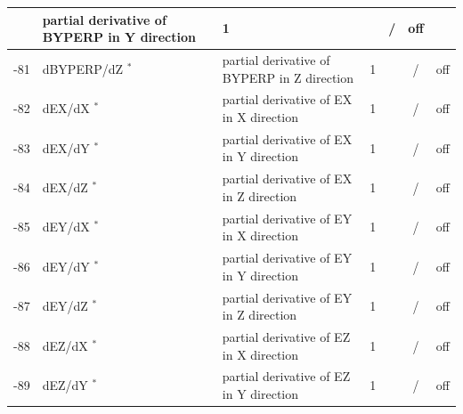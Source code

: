 \begin{landscape}
\begin{longtable}{|r|l|l|l|l|c|c|}
                           & partial derivative of BYPERP in Y direction
                           & 1                            & 
			   & /              & off         
    \\ \hline
    -81                    & dBYPERP/dZ $^*$
                           & partial derivative of BYPERP in Z direction
                           & 1                            & 
			   & /              & off         
    \\ \hline
    -82                    & dEX/dX $^*$
                           & partial derivative of EX in X direction
                           & 1                            & 
			   & /              & off         
    \\ \hline
    -83                    & dEX/dY $^*$
                           & partial derivative of EX in Y direction
                           & 1                            & 
			   & /              & off         
    \\ \hline
    -84                    & dEX/dZ $^*$
                           & partial derivative of EX in Z direction
                           & 1                            & 
			   & /              & off         
    \\ \hline
    -85                    & dEY/dX $^*$
                           & partial derivative of EY in X direction
                           & 1                            & 
			   & /              & off         
    \\ \hline
    -86                    & dEY/dY $^*$
                           & partial derivative of EY in Y direction
                           & 1                            & 
			   & /              & off         
    \\ \hline
    -87                    & dEY/dZ $^*$
                           & partial derivative of EY in Z direction
                           & 1                            & 
			   & /              & off         
    \\ \hline
    -88                    & dEZ/dX $^*$
                           & partial derivative of EZ in X direction
                           & 1                            & 
			   & /              & off         
    \\ \hline
    -89                    & dEZ/dY $^*$
                           & partial derivative of EZ in Y direction
                           & 1                            & 
			   & /              & off         
    \\ \hline

\end{longtable}
\end{landscape}
